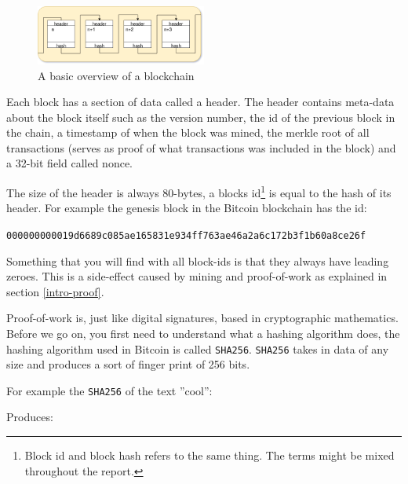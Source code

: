 \begin{figure}[H]
	\centering
	\includegraphics[width=0.5\textwidth]{introduction/images/blockchain.png}
	\caption{A basic overview of a blockchain}
	\label{fig:blockchain}
\end{figure}

Each block has a section of data called a header. The header contains meta-data
about the block itself such as the version number, the id of the previous block
in the chain, a timestamp of when the block was mined, the merkle root of
all transactions (serves as proof of what transactions was included in the block)
and a 32-bit field called nonce.

The size of the header is always 80-bytes, a blocks id\footnote{Block id and
block hash refers to the same thing. The terms might be mixed throughout the report.}
is equal to the hash of its header. For example the genesis block in the
Bitcoin blockchain has the id:

\texttt{000000000019d6689c085ae165831e934ff763ae46a2a6c172b3f1b60a8ce26f}

Something that you will find with all block-ids is that they always have leading zeroes.
This is a side-effect  caused by mining and proof-of-work as explained in section \ref{intro-proof}.

\label{intro-proof}
Proof-of-work is, just like digital signatures, based in cryptographic
mathematics. Before we go on, you first need to understand what a hashing
algorithm does, the hashing algorithm used in Bitcoin is called \texttt{SHA256}.
\texttt{SHA256} takes in data of any size and produces a sort of finger print
of 256 bits.

For example the \texttt{SHA256} of the text ''cool'':


Produces:


